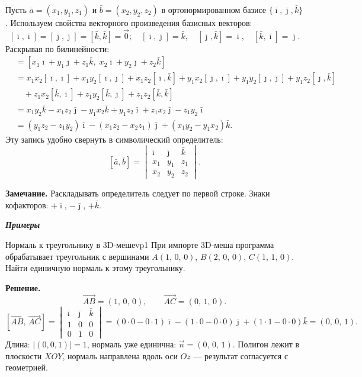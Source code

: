 \documentclass[12pt,a4paper]{article}
\newcommand{\va}{\bar{a}}
\newcommand{\vb}{\bar{b}}
\newcommand{\vi}{\bar{\imath}}
\newcommand{\vj}{\bar{\jmath}}
\newcommand{\vk}{\bar{k}}
\begin{document}
Пусть $\va = (x_1, y_1, z_1)$ и $\vb = (x_2, y_2, z_2)$ в
ортонормированном базисе $\{\vi,\vj,\vk\}$. Используем свойства
векторного произведения базисных векторов:
\[
  [\vi,\vi] = [\vj,\vj] = [\vk,\vk] = \vec{0}; \quad
  [\vi,\vj] = \vk,\quad [\vj,\vk] = \vi,\quad [\vk,\vi] = \vj.
\]
Раскрывая по билинейности:
\begin{align*}
  [\va, \vb]
  &= [x_1\vi + y_1\vj + z_1\vk,\; x_2\vi + y_2\vj + z_2\vk] \\[6pt]
  &= x_1 x_2[\vi,\vi] + x_1 y_2[\vi,\vj] + x_1 z_2[\vi,\vk]
  + y_1 x_2[\vj,\vi] + y_1 y_2[\vj,\vj] + y_1 z_2[\vj,\vk] \\[4pt]
  &\quad + z_1 x_2[\vk,\vi] + z_1 y_2[\vk,\vj] + z_1 z_2[\vk,\vk] \\[6pt]
  &= x_1 y_2\vk - x_1 z_2\vj - y_1 x_2\vk + y_1 z_2\vi
  + z_1 x_2\vj - z_1 y_2\vi \\[4pt]
  &= (y_1 z_2 - z_1 y_2)\vi - (x_1 z_2 - x_2 z_1)\vj
  + (x_1 y_2 - y_1 x_2)\vk.
\end{align*}
Эту запись удобно свернуть в символический определитель:
\begin{equation}
  \boxed{[\va, \vb] =
    \begin{vmatrix} \vi & \vj & \vk \\ x_1 & y_1 & z_1 \\ x_2 & y_2 & z_2
  \end{vmatrix}.} \tag{8.5}
\end{equation}

\noindent
\textbf{Замечание.} Раскладывать определитель следует по первой строке.
Знаки кофакторов: $+\vi$, $-\vj$, $+\vk$.

\medskip

\textbf{\textit{Примеры}}

\begin{exampleBox}{Нормаль к треугольнику в 3D-меше}{vp1}
  При импорте 3D-меша программа обрабатывает треугольник с вершинами
  $A(1,\,0,\,0)$, $B(2,\,0,\,0)$, $C(1,\,1,\,0)$.
  Найти единичную нормаль к этому треугольнику.

  \textbf{Решение.}
  \[
    \overrightarrow{AB} = (1,\,0,\,0), \qquad
    \overrightarrow{AC} = (0,\,1,\,0).
  \]
  \[
    [\overrightarrow{AB},\,\overrightarrow{AC}] =
    \begin{vmatrix} \vi & \vj & \vk \\ 1 & 0 & 0 \\ 0 & 1 & 0
    \end{vmatrix}
    = (0{\cdot}0 - 0{\cdot}1)\vi - (1{\cdot}0 - 0{\cdot}0)\vj
    + (1{\cdot}1 - 0{\cdot}0)\vk
    = (0,\,0,\,1).
  \]
  Длина: $|(0,0,1)| = 1$, нормаль уже единична:
  $\vec{n} = (0,\,0,\,1)$.
  Полигон лежит в плоскости $XOY$, нормаль направлена вдоль оси $Oz$
  --- результат согласуется с геометрией.
\end{exampleBox}
\end{document}
